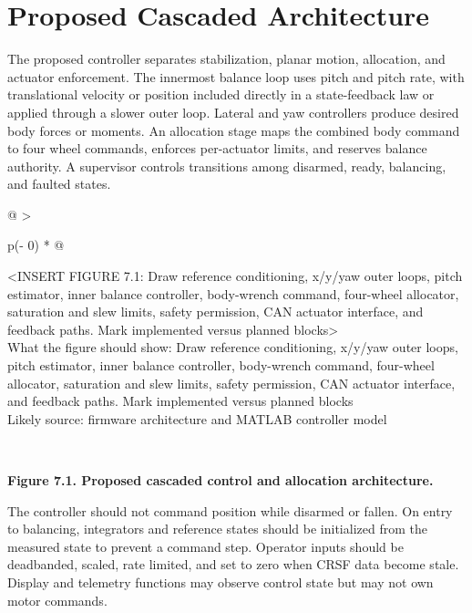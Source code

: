 \section{Proposed Cascaded Architecture}\label{proposed-cascaded-architecture}

The proposed controller separates stabilization, planar motion,
allocation, and actuator enforcement. The innermost balance loop uses
pitch and pitch rate, with translational velocity or position included
directly in a state-feedback law or applied through a slower outer loop.
Lateral and yaw controllers produce desired body forces or moments. An
allocation stage maps the combined body command to four wheel commands,
enforces per-actuator limits, and reserves balance authority. A
supervisor controls transitions among disarmed, ready, balancing, and
faulted states.

\begin{longtable}[]{@{}
  >{\raggedright\arraybackslash}p{(\columnwidth - 0\tabcolsep) * }@{}}
\toprule\noalign{}
\begin{minipage}[b]{\linewidth}\raggedright
\textless INSERT FIGURE 7.1: Draw reference conditioning, x\slash{}y\slash{}yaw outer
loops, pitch estimator, inner balance controller, body-wrench command,
four-wheel allocator, saturation and slew limits, safety permission, CAN
actuator interface, and feedback paths. Mark implemented versus planned
blocks\textgreater{}\\
What the figure should show: Draw reference conditioning, x\slash{}y\slash{}yaw outer
loops, pitch estimator, inner balance controller, body-wrench command,
four-wheel allocator, saturation and slew limits, safety permission, CAN
actuator interface, and feedback paths. Mark implemented versus planned
blocks\\
Likely source: firmware architecture and MATLAB controller model\strut
\end{minipage} \\
\midrule\noalign{}
\endhead
\bottomrule\noalign{}
\endlastfoot
\end{longtable}

\begin{center}\singlespacing
{}
\textbf{Figure 7.1. Proposed cascaded control and allocation architecture.}
\end{center}

The controller should not command position while disarmed or fallen. On
entry to balancing, integrators and reference states should be
initialized from the measured state to prevent a command step. Operator
inputs should be deadbanded, scaled, rate limited, and set to zero when
CRSF data become stale. Display and telemetry functions may observe
control state but may not own motor commands.

